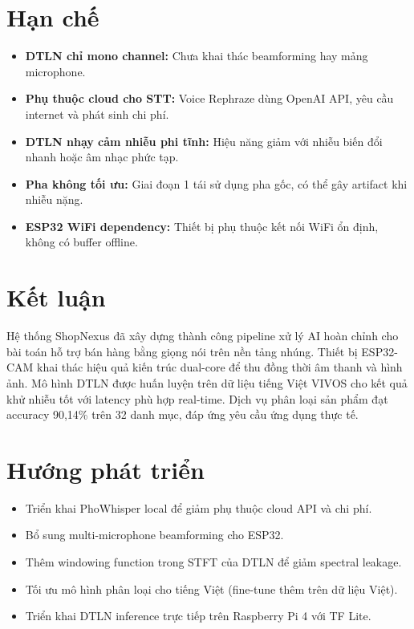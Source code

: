\section{Hạn chế}

\begin{itemize}
\item
  \textbf{DTLN chỉ mono channel:} Chưa khai thác beamforming hay mảng microphone.
\item
  \textbf{Phụ thuộc cloud cho STT:} Voice Rephraze dùng OpenAI API,
  yêu cầu internet và phát sinh chi phí.
\item
  \textbf{DTLN nhạy cảm nhiễu phi tĩnh:} Hiệu năng giảm với nhiễu
  biến đổi nhanh hoặc âm nhạc phức tạp.
\item
  \textbf{Pha không tối ưu:} Giai đoạn 1 tái sử dụng pha gốc, có thể
  gây artifact khi nhiễu nặng.
\item
  \textbf{ESP32 WiFi dependency:} Thiết bị phụ thuộc kết nối WiFi ổn định,
  không có buffer offline.
\end{itemize}

\section{Kết luận}

Hệ thống ShopNexus đã xây dựng thành công pipeline xử lý AI hoàn chỉnh
cho bài toán hỗ trợ bán hàng bằng giọng nói trên nền tảng nhúng.
Thiết bị ESP32-CAM khai thác hiệu quả kiến trúc dual-core để thu đồng thời
âm thanh và hình ảnh. Mô hình DTLN được huấn luyện trên dữ liệu tiếng Việt
VIVOS cho kết quả khử nhiễu tốt với latency phù hợp real-time.
Dịch vụ phân loại sản phẩm đạt accuracy 90,14\% trên 32 danh mục,
đáp ứng yêu cầu ứng dụng thực tế.

\section{Hướng phát triển}

\begin{itemize}
\item Triển khai PhoWhisper local để giảm phụ thuộc cloud API và chi phí.
\item Bổ sung multi-microphone beamforming cho ESP32.
\item Thêm windowing function trong STFT của DTLN để giảm spectral leakage.
\item Tối ưu mô hình phân loại cho tiếng Việt (fine-tune thêm trên dữ liệu Việt).
\item Triển khai DTLN inference trực tiếp trên Raspberry Pi 4 với TF Lite.
\end{itemize}
